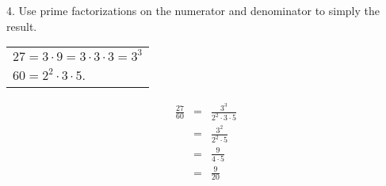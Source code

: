 \documentclass[letterpaper]{article}
\begin{document}
4. Use prime factorizations on the numerator and denominator to simply the
result.

\bigskip

\begin{tabular}{l}
$27=3\cdot9=3\cdot3\cdot3=3^3$ \\
$60=2^2\cdot3\cdot5$.
\end{tabular}

\bigskip

\begin{eqnarray*}
\frac{27}{60} &=& \frac{3^3}{2^2\cdot3\cdot5} \\
              &=& \frac{3^2}{2^2\cdot5} \\
              &=& \frac{9}{4\cdot5} \\
              &=& \frac{9}{20} \\
\end{eqnarray*}
\end{document}
